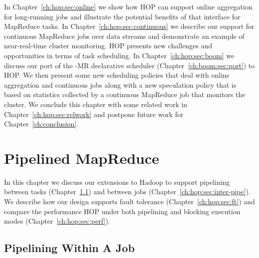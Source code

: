 In Chapter~\ref{ch:hop:sec:online} we show how HOP can support online
aggregation for long-running jobs and illustrate the potential benefits of that
interface for MapReduce tasks.  In Chapter~\ref{ch:hop:sec:continuous} we
describe our support for continuous MapReduce jobs over data streams and
demonstrate an example of near-real-time cluster monitoring.  HOP presents new
challenges and opportunities in terms of task scheduling.  In
Chapter~\ref{ch:hop:sec:boom} we discuss our port of the \BOOM-MR declarative
scheduler (Chapter~\ref{ch:boom:sec:port}) to HOP.  We then present some new
\OVERLOG scheduling policies that deal with online aggregation and continuous
jobs along with a new speculation policy that is based on statistics collected
by a continuous MapReduce job that monitors the cluster.  We conclude this
chapter with some related work in Chapter~\ref{ch:hop:sec:relwork} and postpone
future work for Chapter~\ref{ch:conclusion}.

\section{Pipelined MapReduce}
\label{ch:hop:sec:pipelining}

In this chapter we discuss our extensions to Hadoop to support pipelining
between tasks (Chapter~\ref{ch:hop:sec:intra-pipe}) and between jobs
(Chapter~\ref{ch:hop:sec:inter-pipe}).  We describe how our design supports
fault tolerance (Chapter~\ref{ch:hop:sec:ft}) and compare the performance HOP
under both pipelining and blocking execution modes
(Chapter~\ref{ch:hop:sec:perf}).


\subsection{Pipelining Within A Job}
\label{ch:hop:sec:intra-pipe}

